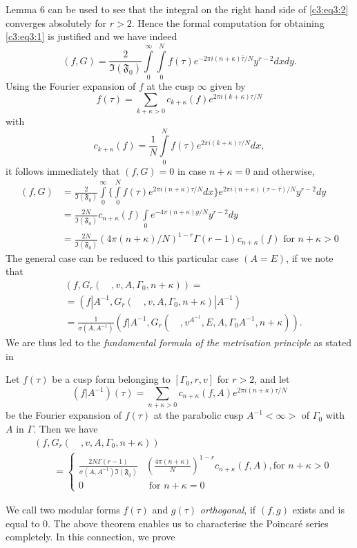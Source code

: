 Lemma 6 can be used to see that the integral on the right hand side of
\eqref{c3:eq3:2} converges absolutely for $r>2$. Hence the formal computation for
obtaining \eqref{c3:eq3:1} is justified and we have indeed 
$$
(f,G) = \frac{2}{\mathfrak{I}(\mathfrak{F}_0)} \int\limits^{\infty}_0
\int\limits^N_0 f(\tau) e^{-2\pi i(n+\kappa)\bar{\tau}/N} y^{r-2} dx dy.
$$
Using the Fourier expansion of $f$ at the cusp $\infty$ given by 
$$
f(\tau) = \sum_{k+\kappa>0} c_{k+\kappa} (f)e^{2\pi i(k+\kappa)\tau/N}
$$
with 
$$
c_{k+\kappa}(f) = \frac{1}{N} \int\limits^{N}_0 f(\tau)e^{2\pi i
  (k+\kappa)\tau/N} dx,
$$
it follows immediately that $(f,G)=0$ in case $n+\kappa=0$ and
otherwise,
\begin{align*}
(f,G) & = \frac{2}{\mathfrak{I}(\mathfrak{F}_0)}
  \int\limits^{\infty}_0\{\int\limits^{N}_0 f(\tau) e^{2\pi
    i(n+\kappa)\tau/N}dx\} e^{2\pi i(n+\kappa)(\tau-\bar{\tau})/N}
  y^{r-2} dy\\
& = \frac{2N}{\mathfrak{I}(\mathfrak{F}_0)} c_{n+\kappa} (f)
  \int\limits_0 e^{-4\pi(n+\kappa)y/N }y^{r-2} dy\\
& = \frac{2N}{\mathfrak{I}(\mathfrak{F_0})}(4\pi(n+\kappa)/N)^{1-r}
  \Gamma(r-1) c_{n+\kappa} (f) \text{ for } n+\kappa>0
\end{align*}
The \pageoriginale general case can be reduced to this particular case
$(A=E)$, if we note that 
\begin{align*}
& (f,G_r(\quad,v,A,\Gamma_0,n+\kappa))= \\
& = (f|A^{-1},G_r(\quad,v,A,\Gamma_0,n+\kappa)|A^{-1})\\
& = \frac{1}{\sigma(A,A^{-1})}
  (f|A^{-1},G_r(\quad,v^{A^{-1}},E,A,\Gamma_0 A^{-1},n+\kappa)).
\end{align*}
We are thus led to the \textit{fundamental formula of the metrisation
  principle} as stated in 

\begin{thm}\label{chap3:thm22}
Let $f(\tau)$ be a cusp form belonging to $[\Gamma_0, r, v]$ for
$r>2$, and let 
$$
(f|A^{-1})(\tau) = \sum_{n+\kappa>0} c_{n+\kappa} (f,A) e^{2\pi
  i(n+\kappa)\tau/N} 
$$
be the Fourier expansion of $f(\tau)$ at the parabolic cusp
$A^{-1}<\infty>$ of $\Gamma_0$ with $A$ in $\Gamma$. Then we have 
\begin{align*}
&(f,G_r(\quad,v,A,\Gamma_0, n+\kappa))\\
&\qquad = \begin{cases}
\frac{2N\Gamma(r-1)}{\sigma(A,A^{-1})\mathfrak{I}(\mathfrak{F}_0)} & 
\left(\frac{4\pi(n+\kappa)}{N}\right)^{1-r} c_{n+\kappa} (f,A), \text{
for } n+\kappa >0\\
0 & \text{ for } n+\kappa=0
  \end{cases}
\end{align*}

We call two modular forms $f(\tau)$ and $g(\tau)$ \textit{orthogonal},
if $(f,g)$ exists and is equal to 0. The above theorem enables us to
characterise the Poincar\'e series completely. In this connection, we
prove 
\end{thm}

